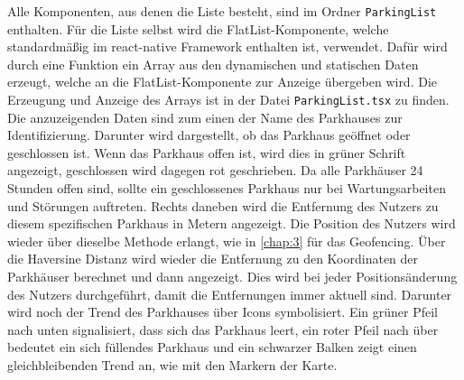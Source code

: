 Alle Komponenten, aus denen die Liste besteht, sind im Ordner \verb|ParkingList| enthalten. Für die Liste selbst wird die FlatList-Komponente, welche standardmäßig im react-native Framework enthalten ist, verwendet. Dafür wird durch eine Funktion ein Array aus den dynamischen und statischen Daten erzeugt, welche an die FlatList-Komponente zur Anzeige übergeben wird. Die Erzeugung und Anzeige des Arrays ist in der Datei \verb|ParkingList.tsx| zu finden. Die anzuzeigenden Daten sind zum einen der Name des Parkhauses zur Identifizierung. Darunter wird dargestellt, ob das Parkhaus geöffnet oder geschlossen ist. Wenn das Parkhaus offen ist, wird dies in grüner Schrift angezeigt, geschlossen wird dagegen rot geschrieben. Da alle Parkhäuser 24 Stunden offen sind, sollte ein geschlossenes Parkhaus nur bei Wartungsarbeiten und Störungen auftreten. Rechts daneben wird die Entfernung des Nutzers zu diesem spezifischen Parkhaus in Metern angezeigt. Die Position des Nutzers wird wieder über dieselbe Methode erlangt, wie in \autoref{chap:3} für das Geofencing. Über die Haversine Distanz wird wieder die Entfernung zu den Koordinaten der Parkhäuser berechnet und dann angezeigt. Dies wird bei jeder Positionsänderung des Nutzers durchgeführt, damit die Entfernungen immer aktuell sind. Darunter wird noch der Trend des Parkhauses über Icons symbolisiert. Ein grüner Pfeil nach unten signalisiert, dass sich das Parkhaus leert, ein roter Pfeil nach über bedeutet ein sich füllendes Parkhaus und ein schwarzer Balken zeigt einen gleichbleibenden Trend an, wie mit den Markern der Karte.


